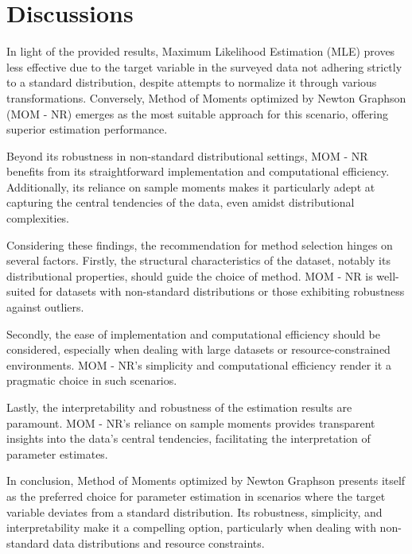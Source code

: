 \documentclass[12pt]{article}
\begin{document}
	\section{Discussions}
	
	In light of the provided results, Maximum Likelihood Estimation (MLE) proves less effective due to the target variable in the surveyed data not adhering strictly to a standard distribution, despite attempts to normalize it through various transformations. Conversely, Method of Moments optimized by Newton Graphson (MOM - NR) emerges as the most suitable approach for this scenario, offering superior estimation performance.
	
	Beyond its robustness in non-standard distributional settings, MOM - NR benefits from its straightforward implementation and computational efficiency. Additionally, its reliance on sample moments makes it particularly adept at capturing the central tendencies of the data, even amidst distributional complexities.
	
	Considering these findings, the recommendation for method selection hinges on several factors. Firstly, the structural characteristics of the dataset, notably its distributional properties, should guide the choice of method. MOM - NR is well-suited for datasets with non-standard distributions or those exhibiting robustness against outliers.
	
	Secondly, the ease of implementation and computational efficiency should be considered, especially when dealing with large datasets or resource-constrained environments. MOM - NR's simplicity and computational efficiency render it a pragmatic choice in such scenarios.
	
	Lastly, the interpretability and robustness of the estimation results are paramount. MOM - NR's reliance on sample moments provides transparent insights into the data's central tendencies, facilitating the interpretation of parameter estimates.
	
	In conclusion, Method of Moments optimized by Newton Graphson presents itself as the preferred choice for parameter estimation in scenarios where the target variable deviates from a standard distribution. Its robustness, simplicity, and interpretability make it a compelling option, particularly when dealing with non-standard data distributions and resource constraints.
	
\end{document}
